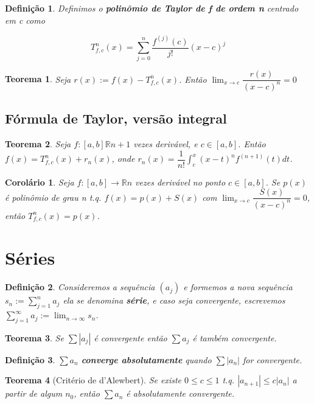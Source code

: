 \documentclass[12pt]{article}
\newtheorem{theorem}{Teorema}[section]
\newtheorem{corollary}{Corolário}[theorem]
\newtheorem{definition}{Definição}
\begin{document}
\begin{definition}
    Definimos o \textbf{polinômio de Taylor de f de ordem n} centrado em c como
    
    $$T_{f, c}^n (x) = \sum_{j=0}^n \dfrac{f^{(j)} (c)}{j!} (x-c)^j$$
\end{definition}

\begin{theorem}
    Seja $r(x) := f(x) - T_{f,c}^n (x)$. Então $\lim_{x \rightarrow{} c} \dfrac{r(x)}{(x-c)^n} = 0$
\end{theorem}

\subsection{Fórmula de Taylor, versão integral}
\begin{theorem}
    Seja $f: [a, b] \mathbb{R} n+1$ vezes derivável, e $c \in [a, b]$. Então $f(x) = T_{f,c}^n (x) + r_n (x)$, onde $r_n (x) = \dfrac{1}{n!} \int_c^x (x - t)^n f^{(n+1)} (t) d t$.
\end{theorem}

\begin{corollary}
    Seja $f: [a, b] \rightarrow{} \mathbb{R} n$ vezes derivável no ponto $c \in [a, b]$. Se $p(x)$ é polinômio de grau n t.q. $f(x) = p(x) + S(x)$ com $\lim_{x \rightarrow{} c} \dfrac{S(x)}{(x-c)^n} = 0$, então $T_{f,c}^n (x) = p(x)$.
\end{corollary}

\section{Séries}
\begin{definition}
    Consideremos a sequência $(a_j)$ e formemos a nova sequência $s_n := \sum_{j = 1}^n a_j$ ela se denomina \textbf{série}, e caso seja convergente, escrevemos $\sum_{j = 1}^\infty a_j := \lim_{n \rightarrow{} \infty} s_n$.
\end{definition}

\begin{theorem}
    Se $\sum |a_j|$ é convergente então $\sum a_j$ é também convergente.
\end{theorem}

\begin{definition}
    $\sum a_n$ \textbf{converge absolutamente} quando $\sum |a_n|$ for convergente.
\end{definition}

\begin{theorem}[Critério de d'Alewbert]
    Se existe $0 \leq c \leq 1$ t.q. $|a_{n+1}| \leq c |a_n|$ a partir de algum $n_0$, então $\sum a_n$ é absolutamente convergente.
\end{theorem}
\end{document}
